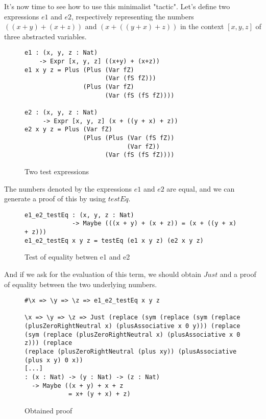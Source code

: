 It's now time to see how to use this minimalist "tactic".
Let's define two expressions $e1$ and $e2$, respectively representing the numbers $((x + y) + (x + z))$ and $(x + ((y + x) + z))$ in the context $[x, y, z]$ of three abstracted variables.


\begin{figure}[H]
\figrule
\begin{center}
\begin{verbatim}
e1 : (x, y, z : Nat) 
    -> Expr [x, y, z] ((x+y) + (x+z))
e1 x y z = Plus (Plus (Var fZ) 
                      (Var (fS fZ))) 
                (Plus (Var fZ) 
                      (Var (fS (fS fZ))))

e2 : (x, y, z : Nat) 
     -> Expr [x, y, z] (x + ((y + x) + z))
e2 x y z = Plus (Var fZ) 
                (Plus (Plus (Var (fS fZ)) 
                            (Var fZ)) 
                      (Var (fS (fS fZ))))
\end{verbatim}
\end{center}
\caption{Two test expressions}
\figrule
\end{figure}

The numbers denoted by the expressions $e1$ and $e2$ are equal, and we can generate a proof of this by using $testEq$.

\begin{figure}[H]
\figrule
\begin{center}
\begin{verbatim}
e1_e2_testEq : (x, y, z : Nat) 
             -> Maybe (((x + y) + (x + z)) = (x + ((y + x) + z)))
e1_e2_testEq x y z = testEq (e1 x y z) (e2 x y z)
\end{verbatim}
\end{center}
\caption{Test of equality betwen e1 and e2}
\figrule
\end{figure}


And if we ask for the evaluation of this term, we should obtain $Just$ and a proof of equality between the two underlying numbers.

\begin{figure}[H]
\figrule
\begin{center}
\begin{verbatim}
#\x => \y => \z => e1_e2_testEq x y z

\x => \y => \z => Just (replace (sym (replace (sym (replace 
(plusZeroRightNeutral x) (plusAssociative x 0 y))) (replace 
(sym (replace (plusZeroRightNeutral x) (plusAssociative x 0 z))) (replace 
(replace (plusZeroRightNeutral (plus xy)) (plusAssociative (plus x y) 0 x)) 
[...]
: (x : Nat) -> (y : Nat) -> (z : Nat) 
  -> Maybe ((x + y) + x + z 
            = x+ (y + x) + z)
\end{verbatim}
\end{center}
\caption{Obtained proof}
\figrule
\end{figure}

